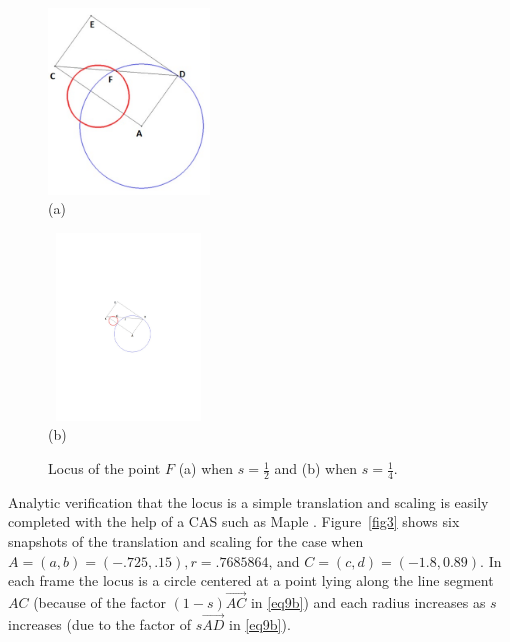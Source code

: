 \documentclass[12pt,a4paper]{article}%
\begin{document}
\begin{figure}[htpb]
\begin{center}
\parbox[b]{1.7in}{\begin{center}
\includegraphics[natheight=3.276500in,natwidth=2.849000in,height=1.946in,width=1.6941in]{Figure6.pdf}
 \\ (a)
\end{center}}
\qquad
\parbox[b]{1.7in}{\begin{center}
\includegraphics[natheight=3.276500in,natwidth=2.813500in,height=1.9567in,width=1.6826in]{Figure7.pdf}
 \\ (b)
\end{center}}
\end{center}
\caption{Locus of the point $F$ (a) when $s=\frac{1}{2}$ and (b) when $s=\frac{1}{4}$.}
\label{fig2}
\end{figure}

Analytic verification that the locus is a simple translation and scaling
is easily completed with the help of a CAS such as Maple \cite{Maple}.
Figure~\ref{fig3} shows six snapshots of the translation and scaling
for the case when $A=(a,b)=(-.725,.15),r=.7685864$, and $C=(c,d)=(-1.8,0.89)$.
In each frame the locus is a circle centered at a point lying along
the line segment $AC$ (because of the factor $(1-s) \overrightarrow{AC}$
in \ref{eq9b}) and
each radius increases as $s$ increases (due to the
factor of $s \overrightarrow{AD}$ in \ref{eq9b}).
\end{document}
